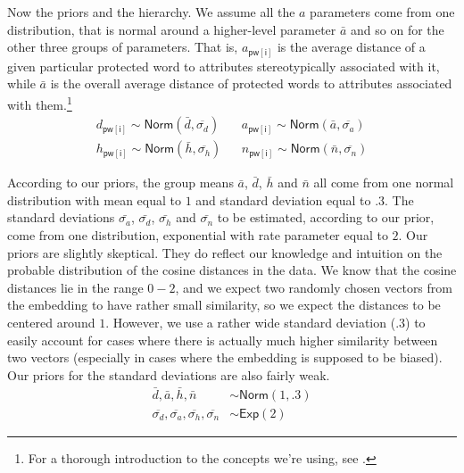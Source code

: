 \documentclass{clv3}
\begin{document}
Now the priors and the hierarchy. We assume all the \(a\) parameters
come from one distribution, that is normal around a higher-level
parameter \(\bar{a}\) and so on for the other three groups of
parameters. That is, \(a_{\mathsf{pw[i]}}\) is the average distance of a
given particular protected word to attributes stereotypically associated
with it, while \(\bar{a}\) is the overall average distance of protected
words to attributes associated with them.\footnote{For a thorough
  introduction to the concepts we're using, see \citep{kruschke2015bayesian,statrethinkingbook2020}.}
\begin{align*}
d_{\mathsf{pw[i]}} \sim \mathsf{Norm}(\bar{d}, \overline{\sigma_d}) &  & 
a_{\mathsf{pw[i]}} \sim \mathsf{Norm}(\bar{a}, \overline{\sigma_a}) \\
h_{\mathsf{pw[i]}} \sim \mathsf{Norm}(\bar{h}, \overline{\sigma_h}) & & 
n_{\mathsf{pw[i]}} \sim \mathsf{Norm}(\bar{n}, \overline{\sigma_n}) 
\end{align*}

According to our priors, the group means \(\bar{a}\), \(\bar{d}\),
\(\bar{h}\) and \(\bar{n}\) all come from one normal distribution with
mean equal to \(1\) and standard deviation equal to \(.3\). The standard
deviations \(\bar{\sigma_a}\), \(\bar{\sigma_d}\), \(\bar{\sigma_h}\)
and \(\bar{\sigma_n}\) to be estimated, according to our prior, come
from one distribution, exponential with rate parameter equal to \(2\).
Our priors are slightly skeptical. They do reflect our knowledge and
intuition on the probable distribution of the cosine distances in the
data. We know that the cosine distances lie in the range \(0-2\), and we
expect two randomly chosen vectors from the embedding to have rather
small similarity, so we expect the distances to be centered around
\(1\). However, we use a rather wide standard deviation (\(.3\)) to
easily account for cases where there is actually much higher similarity
between two vectors (especially in cases where the embedding is supposed
to be biased). Our priors for the standard deviations are also fairly
weak. \begin{align*}
\bar{d}, \bar{a}, \bar{h}, \bar{n} &\sim \mathsf{Norm}(1, .3)\\ 
\overline{\sigma_d}, \overline{\sigma_a},  \overline{\sigma_h},  \overline{\sigma_n}  &\sim \mathsf{Exp}(2)
\end{align*}
\end{document}
